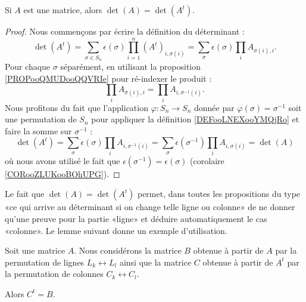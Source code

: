 \begin{lemma}             \label{LEMooCEQYooYAbctZ}
	Si \( A\) est une matrice, alors \( \det(A)=\det(A^t)\).
\end{lemma}

\begin{proof}
	Nous commençons par écrire la définition du déterminant :
	\begin{equation}
		\det(A^t)=\sum_{\sigma\in S_n}\epsilon(\sigma)\prod_{i=1}^n (A^t)_{i,\sigma(i)}=\sum_{\sigma} \epsilon(\sigma)\prod_i A_{\sigma(i),i}.
	\end{equation}
	Pour chaque \( \sigma\) séparément, en utilisant la proposition \ref{PROPooQMUDooQQVRIe} pour ré-indexer le produit :
	\begin{equation}
		\prod_i A_{\sigma(i),i}=\prod_i A_{i,\sigma^{-1}(i)}.
	\end{equation}
	Nous profitons du fait que l'application \( \varphi\colon S_n\to S_n\) donnée par \( \varphi(\sigma)=\sigma^{-1}\) soit une permutation de \( S_n\) pour appliquer la définition \ref{DEFooLNEXooYMQjRo} et faire la somme sur \( \sigma^{-1}\) :
	\begin{equation}
		\det(A^t)=\sum_{\sigma}\epsilon(\sigma)\prod_iA_{i,\sigma^{-1}(i)}=\sum_{\sigma}\epsilon(\sigma^{-1})\prod_iA_{i,\sigma(i)}=\det(A)
	\end{equation}
	où nous avons utilisé le fait que \(\epsilon(\sigma^{-1})=\epsilon(\sigma)\) (corolaire \ref{CORooZLUKooBOhUPG}).
\end{proof}

Le fait que \( \det(A)=\det(A^t)\) permet, dans toutes les propositions du type «ce qui arrive au déterminant si on change telle ligne ou colonne» de ne donner qu'une preuve pour la partie «ligne» et déduire automatiquement le cas «colonne». Le lemme suivant donne un exemple d'utilisation.

\begin{lemma}        \label{LEMooWMQWooGWFlmC}
	Soit une matrice \( A\). Nous considérons la matrice \( B\) obtenue à partir de \( A\) par la permutation de lignes \( L_k\leftrightarrow L_l\) ainsi que la matrice \( C\) obtenue à partir de \( A^t\) par la permutation de colonnes \( C_k\leftrightarrow C_l\).

	Alors \( C^t=B\).
\end{lemma}

